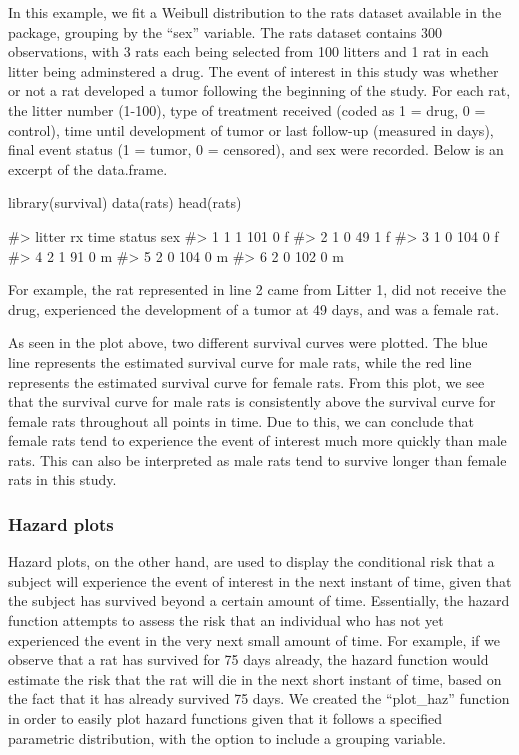 In this example, we fit a Weibull distribution to the rats dataset
available in the  package, grouping by the ``sex''
variable. The rats dataset contains 300 observations, with 3 rats each
being selected from 100 litters and 1 rat in each litter being
adminstered a drug. The event of interest in this study was whether or
not a rat developed a tumor following the beginning of the study. For
each rat, the litter number (1-100), type of treatment received (coded
as 1 = drug, 0 = control), time until development of tumor or last
follow-up (measured in days), final event status (1 = tumor, 0 =
censored), and sex were recorded. Below is an excerpt of the data.frame.

\begin{Schunk}
\begin{Sinput}
library(survival)
data(rats)
head(rats)
\end{Sinput}
\begin{Soutput}
#>   litter rx time status sex
#> 1      1  1  101      0   f
#> 2      1  0   49      1   f
#> 3      1  0  104      0   f
#> 4      2  1   91      0   m
#> 5      2  0  104      0   m
#> 6      2  0  102      0   m
\end{Soutput}
\end{Schunk}

For example, the rat represented in line 2 came from Litter 1, did not
receive the drug, experienced the development of a tumor at 49 days, and
was a female rat.

As seen in the plot above, two different survival curves were plotted.
The blue line represents the estimated survival curve for male rats,
while the red line represents the estimated survival curve for female
rats. From this plot, we see that the survival curve for male rats is
consistently above the survival curve for female rats throughout all
points in time. Due to this, we can conclude that female rats tend to
experience the event of interest much more quickly than male rats. This
can also be interpreted as male rats tend to survive longer than female
rats in this study.

\hypertarget{hazard-plots}{%
\subsubsection{Hazard plots}\label{hazard-plots}}

Hazard plots, on the other hand, are used to display the conditional
risk that a subject will experience the event of interest in the next
instant of time, given that the subject has survived beyond a certain
amount of time. Essentially, the hazard function attempts to assess the
risk that an individual who has not yet experienced the event in the
very next small amount of time. For example, if we observe that a rat
has survived for 75 days already, the hazard function would estimate the
risk that the rat will die in the next short instant of time, based on
the fact that it has already survived 75 days. We created the
``plot\_haz'' function in order to easily plot hazard functions given
that it follows a specified parametric distribution, with the option to
include a grouping variable.

